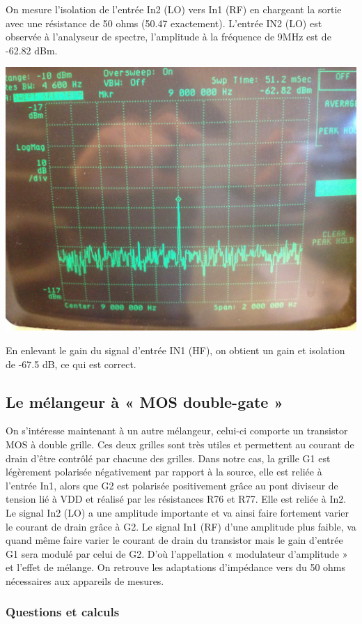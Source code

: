 \documentclass{article}
\begin{document}

On mesure l'isolation de l'entrée In2 (LO) vers In1 (RF) en chargeant la sortie avec une résistance de 50 ohms (50.47 exactement).
L'entrée IN2 (LO) est observée à l'analyseur de spectre, l'amplitude à la fréquence de 9MHz est de -62.82 dBm.
\begin{center}
\includegraphics[width=0.7\linewidth]{9_3_5.jpg}
\end{center}
En enlevant le gain du signal d'entrée IN1 (HF), on obtient un gain et isolation de -67.5 dB, ce qui est correct.


\subsection{Le mélangeur à « MOS double-gate »}

On s'intéresse maintenant à un autre mélangeur, celui-ci comporte un transistor MOS à double grille. Ces deux grilles sont très utiles et permettent au courant de drain d'être contrôlé par chacune des grilles. Dans notre cas, la grille G1 est légèrement polarisée négativement par rapport à la source, elle est reliée à l'entrée In1, alors que G2 est polarisée positivement grâce au pont diviseur de tension lié à VDD et réalisé par les résistances R76 et R77. Elle est reliée à In2.
Le signal In2 (LO) a une amplitude importante et va ainsi faire fortement varier le courant de drain grâce à G2. Le signal In1 (RF) d'une amplitude plus faible, va quand même faire varier le courant de drain du transistor mais le gain d'entrée G1 sera modulé par celui de G2. D'où l'appellation « modulateur d'amplitude » et l'effet de mélange.
On retrouve les adaptations d'impédance vers du 50 ohms nécessaires aux appareils de mesures.



\subsubsection{Questions et calculs}
\end{document}

